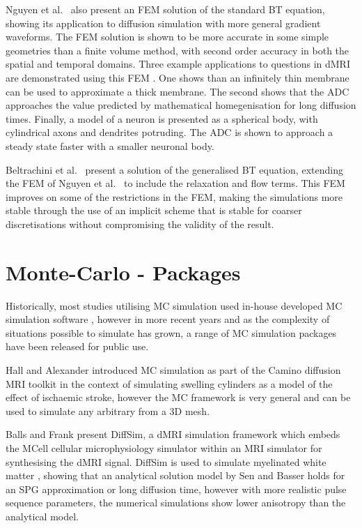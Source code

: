 Nguyen et al.\ \cite{Nguyen2014} also present an \ac{FEM} solution of the standard \ac{BT} equation, showing its application to diffusion simulation with more general gradient waveforms.
The \ac{FEM} solution is shown to be more accurate in some simple geometries than a finite volume method, with second order accuracy in both the spatial and temporal domains.
Three example applications to questions in \ac{dMRI} are demonstrated using this \ac{FEM}
\cite{Nguyen2014}.
One shows than an infinitely thin membrane can be used to approximate a thick membrane. The second shows that the \ac{ADC} approaches the value predicted by mathematical homegenisation for long diffusion times. Finally, a model of a neuron is presented as a spherical body, with cylindrical axons and dendrites potruding. The \ac{ADC} is shown to approach a steady state faster with a smaller neuronal body.

Beltrachini et al.\ \cite{Beltrachini2016} present a solution of the generalised \ac{BT} equation, extending the \ac{FEM} of Nguyen et al.\ \cite{Nguyen2014} to include the relaxation and flow terms. This \ac{FEM} improves on some of the restrictions in the \ac{FEM}, making the simulations more stable through the use of an implicit scheme that is stable for coarser discretisations without compromising the validity of the result. 


\section{Monte-Carlo - Packages}
\label{sec:app_monte_carlo_packages}
Historically, most studies utilising \ac{MC} simulation used in-house developed \ac{MC} simulation software \cite{Lipinski1990, Szafer1995,Stanisz1997, Duh2001}, however in more recent years and as the complexity of situations possible to simulate has grown, a range of \ac{MC} simulation packages have been released for public use.

Hall and Alexander \cite{Hall2009} introduced \ac{MC} simulation as part of the Camino diffusion MRI toolkit \cite{Cook2006} in the context of simulating swelling cylinders as a model of the effect of ischaemic stroke, however the \ac{MC} framework is very general and can be used to simulate any arbitrary from a 3D mesh. 

Balls and Frank \cite{Balls2009} present DiffSim, a dMRI simulation framework which embeds the MCell \cite{Stiles1996,Stiles2001, Kerr2008} cellular microphysiology simulator within an \ac{MRI} simulator for synthesising the \ac{dMRI} signal.
DiffSim is used to simulate myelinated white matter \cite{Baxter2013}, showing that an analytical solution model by Sen and Basser \cite{Sen2005} holds for an \ac{SPG} approximation or long diffusion time, however with more realistic pulse sequence parameters, the numerical simulations show lower anisotropy than the analytical model. 

